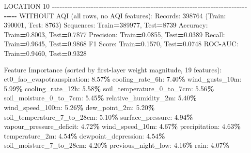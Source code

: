 \documentclass[
  letterpaper,
  DIV=11,
  numbers=noendperiod]{scrartcl}
\newenvironment{Shaded}{\begin{snugshade}}{\end{snugshade}}
\newcommand{\BuiltInTok}[1]{#1}
\newcommand{\DecValTok}[1]{\textcolor[rgb]{0.00,0.00,0.81}{#1}}
\newcommand{\FloatTok}[1]{\textcolor[rgb]{0.00,0.00,0.81}{#1}}
\newcommand{\NormalTok}[1]{#1}
\newcommand{\OperatorTok}[1]{\textcolor[rgb]{0.81,0.36,0.00}{\textbf{#1}}}
\begin{document}
\begin{Shaded}
\begin{Highlighting}[]
\NormalTok{LOCATION }\DecValTok{10}
\OperatorTok{{-}{-}{-}{-}{-}{-}{-}{-}{-}{-}{-}{-}{-}{-}{-}{-}{-}{-}{-}{-}{-}{-}{-}{-}{-}{-}{-}{-}{-}{-}{-}{-}{-}{-}{-}{-}{-}{-}{-}{-}{-}{-}{-}{-}{-}{-}{-}{-}{-}{-}{-}{-}{-}{-}{-}{-}{-}{-}{-}{-}{-}{-}{-}{-}{-}{-}{-}{-}{-}{-}{-}{-}{-}{-}{-}{-}{-}{-}{-}{-}}
\NormalTok{WITHOUT AQI (}\BuiltInTok{all}\NormalTok{ rows, no AQI features):}
\NormalTok{  Records: }\DecValTok{398764}\NormalTok{ (Train: }\DecValTok{390001}\NormalTok{, Test: }\DecValTok{8763}\NormalTok{)}
\NormalTok{  Sequences: Train}\OperatorTok{=}\DecValTok{389977}\NormalTok{, Test}\OperatorTok{=}\DecValTok{8739}
\NormalTok{  Accuracy: Train}\OperatorTok{=}\FloatTok{0.8003}\NormalTok{, Test}\OperatorTok{=}\FloatTok{0.7877}
\NormalTok{  Precision: Train}\OperatorTok{=}\FloatTok{0.0855}\NormalTok{, Test}\OperatorTok{=}\FloatTok{0.0389}
\NormalTok{  Recall: Train}\OperatorTok{=}\FloatTok{0.9645}\NormalTok{, Test}\OperatorTok{=}\FloatTok{0.9868}
\NormalTok{  F1 Score: Train}\OperatorTok{=}\FloatTok{0.1570}\NormalTok{, Test}\OperatorTok{=}\FloatTok{0.0748}
\NormalTok{  ROC}\OperatorTok{{-}}\NormalTok{AUC: Train}\OperatorTok{=}\FloatTok{0.9460}\NormalTok{, Test}\OperatorTok{=}\FloatTok{0.9328}

\NormalTok{  Feature Importance (}\BuiltInTok{sorted}\NormalTok{ by first}\OperatorTok{{-}}\NormalTok{layer weight magnitude, }\DecValTok{19}\NormalTok{ features):}
\NormalTok{    et0\_fao\_evapotranspiration: }\FloatTok{8.57}\OperatorTok{\%}
\NormalTok{    cooling\_rate\_6h: }\FloatTok{7.40}\OperatorTok{\%}
\NormalTok{    wind\_gusts\_10m: }\FloatTok{5.99}\OperatorTok{\%}
\NormalTok{    cooling\_rate\_12h: }\FloatTok{5.58}\OperatorTok{\%}
\NormalTok{    soil\_temperature\_0\_to\_7cm: }\FloatTok{5.56}\OperatorTok{\%}
\NormalTok{    soil\_moisture\_0\_to\_7cm: }\FloatTok{5.45}\OperatorTok{\%}
\NormalTok{    relative\_humidity\_2m: }\FloatTok{5.40}\OperatorTok{\%}
\NormalTok{    wind\_speed\_100m: }\FloatTok{5.26}\OperatorTok{\%}
\NormalTok{    dew\_point\_2m: }\FloatTok{5.20}\OperatorTok{\%}
\NormalTok{    soil\_temperature\_7\_to\_28cm: }\FloatTok{5.10}\OperatorTok{\%}
\NormalTok{    surface\_pressure: }\FloatTok{4.94}\OperatorTok{\%}
\NormalTok{    vapour\_pressure\_deficit: }\FloatTok{4.72}\OperatorTok{\%}
\NormalTok{    wind\_speed\_10m: }\FloatTok{4.67}\OperatorTok{\%}
\NormalTok{    precipitation: }\FloatTok{4.63}\OperatorTok{\%}
\NormalTok{    temperature\_2m: }\FloatTok{4.54}\OperatorTok{\%}
\NormalTok{    dewpoint\_depression: }\FloatTok{4.54}\OperatorTok{\%}
\NormalTok{    soil\_moisture\_7\_to\_28cm: }\FloatTok{4.20}\OperatorTok{\%}
\NormalTok{    previous\_night\_low: }\FloatTok{4.16}\OperatorTok{\%}
\NormalTok{    rain: }\FloatTok{4.07}\OperatorTok{\%}


\end{Highlighting}
\end{Shaded}
\end{document}
